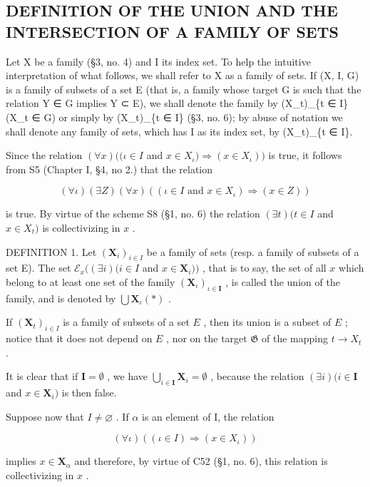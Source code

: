 \subsection{DEFINITION OF THE UNION AND THE INTERSECTION OF A FAMILY OF SETS}

Let X be a family (§3, no. 4) and I its index set. To help the intuitive interpretation of what follows, we shall refer to X as a family of sets. If (X, I, G) is a family of subsets of a set E (that is, a family whose target G is such that the relation Y ∈ G implies Y ⊂ E), we shall denote the family by (X\_t)\_\{t ∈ I\}(X\_t ∈ G) or simply by (X\_t)\_\{t ∈ I\} (§3, no. 6); by abuse of notation we shall denote any family of sets, which has I as its index set, by (X\_t)\_\{t ∈ I\}.

Since the relation \((\forall x)((\iota \in I\) and \(x\in X_{\iota})\Longrightarrow (x\in X_{\iota}))\) is true, it follows from S5 (Chapter I, §4, no 2.) that the relation

\[
(\forall \iota) (\exists Z) (\forall x) ((\iota \in I \text { and } x \in X _ {\iota}) \Longrightarrow (x \in Z))
\]

is true. By virtue of the scheme S8 (§1, no. 6) the relation \((\exists t)(t \in I\) and \(x \in X_t)\) is collectivizing in \(x\) .

DEFINITION 1. Let \((\mathbf{X}_i)_{i\in I}\) be a family of sets (resp. a family of subsets of a set E). The set \(\mathcal{E}_x((\exists i)(i\in I\) and \(x\in \mathbf{X}_i))\) , that is to say, the set of all \(x\) which belong to at least one set of the family \((\mathbf{X}_{\iota})_{\iota \in \mathbf{I}}\) , is called the union of the family, and is denoted by \(\bigcup \mathbf{X}_{\iota}(*)\) .

If \((\mathbf{X}_t)_{i\in I}\) is a family of subsets of a set \(E\) , then its union is a subset of \(E\) ; notice that it does not depend on \(E\) , nor on the target \(\mathfrak{G}\) of the mapping \(t\to X_t\) .

It is clear that if \(\mathbf{I} = \emptyset\) , we have \(\bigcup_{i \in \mathbf{I}} \mathbf{X}_i = \emptyset\) , because the relation \((\exists i)(i \in \mathbf{I}\) and \(x \in \mathbf{X}_i)\) is then false.

Suppose now that \(I \neq \varnothing\) . If \(\alpha\) is an element of I, the relation

\[
(\forall \iota) ((\iota \in I) \Longrightarrow (x \in X _ {\iota}))
\]

implies \(x \in \mathbf{X}_{\alpha}\) and therefore, by virtue of C52 (§1, no. 6), this relation is collectivizing in \(x\) .

